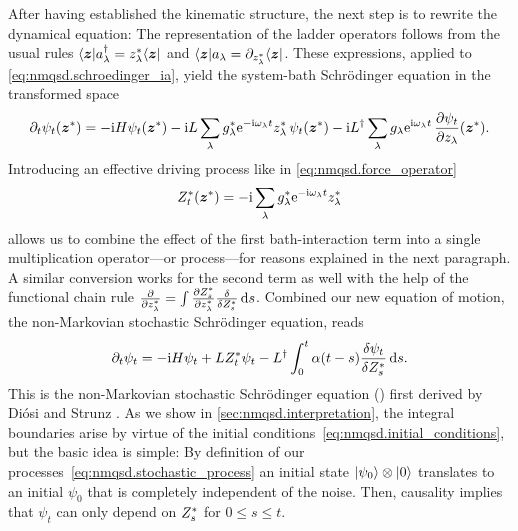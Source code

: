 After having established the kinematic structure, the next step is to rewrite the dynamical equation:
The representation of the ladder operators follows from the usual rules $\langle \boldsymbol{z} | a^\dagger_\lambda = {z}^*_\lambda \langle \boldsymbol{z} |$ and $\langle \boldsymbol{z} | a_\lambda = \partial_{{z}^*_\lambda} \langle \boldsymbol{z} |$.
These expressions, applied to \autoref{eq:nmqsd.schroedinger_ia}, yield the system-bath Schrödinger equation in the transformed space
\begin{equation}
  \partial_t \psi_t(\cc\zz) = -\ii\Hsys\psi_t(\cc\zz)  -  \ii L \sum_\lambda \cc g_\lambda \exp[-\ii\omega_\lambda t] \cc z_\lambda \, \psi_t(\cc\zz)  -  \ii \adj{L} \sum_\lambda g_\lambda \exp[\ii\omega_\lambda t] \, \frac{\partial \psi_t}{\partial z_\lambda}(\cc\zz).
  \label{eq:nmqsd.hamiltonian_microsopic}
\end{equation}
Introducing an effective driving process like in \autoref{eq:nmqsd.force_operator}
\begin{equation}
  \ZZ_t(\cc\zz) = - \ii \sum_\lambda \cc g_\lambda \exp[-\ii \omega_\lambda t] \cc z_\lambda
  \label{eq:nmqsd.stochastic_process}
\end{equation}
allows us to combine the effect of the first bath-interaction term into a single multiplication operator---or process---for reasons explained in the next paragraph.
A similar conversion works for the second term as well with the help of the functional chain rule $\frac{\partial}{\partial {z}^*_\lambda} = \int \frac{\partial {Z}^*_s}{\partial{z}^*_\lambda} \frac{\delta}{\delta {Z}^*_s} \, \mathrm{d} s$.
Combined our new equation of motion, the non-Markovian stochastic Schrödinger equation, reads
\begin{equation}
  \partial_t \psi_t = -\mathrm{i}H\psi_t  +  L{Z}^*_t\psi_t  -  L^\dagger \int_0^t \alpha(t-s) \frac{\delta \psi_t}{\delta {Z}^*_s} \, \mathrm{d} s.
  \label{eq:nmqsd.nmsse}
\end{equation}
This is the non-Markovian stochastic Schrödinger equation (\NMSSE) first derived by Diósi and Strunz \cite{DiSt97_nmsse}.
As we show in \autoref{sec:nmqsd.interpretation}, the integral boundaries arise by virtue of the initial conditions~\ref{eq:nmqsd.initial_conditions}, but the basic idea is simple:
By definition of our processes~\ref{eq:nmqsd.stochastic_process} an initial state $| \psi_0 \rangle\otimes| 0 \rangle$ translates to an initial $\psi_0$ that is completely independent of the noise.
Then, causality implies that $\psi_t$ can only depend on ${Z}^*_s$ for $0 \le s \le t$.\\



